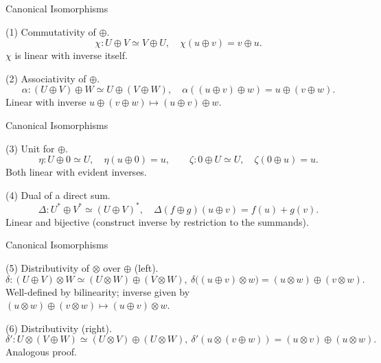 \begin{frame}{Canonical Isomorphisms}
\begin{block}{(1) Commutativity of $\oplus$.}
\[
\chi:U\oplus V\simeq V\oplus U,\quad \chi(u\oplus v)=v\oplus u.
\]
$\chi$ is linear with inverse itself.
\end{block}

\begin{block}{(2) Associativity of $\oplus$.}
\[
\alpha:(U\oplus V)\oplus W \simeq U\oplus (V\oplus W),\quad \alpha((u\oplus v)\oplus w)=u\oplus (v\oplus w).
\]
Linear with inverse $u\oplus (v\oplus w)\mapsto (u\oplus v)\oplus w$.
\end{block}
\end{frame}

\begin{frame}{Canonical Isomorphisms}
\begin{block}{(3) Unit for $\oplus$.}
\[
\eta: U\oplus 0 \simeq U,\quad \eta(u\oplus 0)=u,\qquad
\zeta: 0\oplus U \simeq U,\quad \zeta(0\oplus u)=u.
\]
Both linear with evident inverses.

\end{block}

\begin{block}{(4) Dual of a direct sum.}
\[
\Delta: U^*\oplus V^* \simeq (U\oplus V)^*,\quad
\Delta(f\oplus g)(u\oplus v)= f(u)+g(v).
\]
Linear and bijective (construct inverse by restriction to the summands).

\end{block}
\end{frame}

\begin{frame}{Canonical Isomorphisms}
\begin{block}{(5) Distributivity of $\otimes$ over $\oplus$ (left).}
\[
\delta:(U\oplus V)\otimes W \simeq (U\otimes W)\oplus (V\otimes W),\
\delta\big((u\oplus v)\otimes w\big)=(u\otimes w)\oplus (v\otimes w).
\]
Well-defined by bilinearity; inverse given by $(u\otimes w)\oplus (v\otimes w)\mapsto (u\oplus v)\otimes w$.
\end{block}

\begin{block}{(6) Distributivity (right).}
\[
\delta': U\otimes (V\oplus W) \simeq (U\otimes V)\oplus (U\otimes W),\
\delta'(u\otimes (v\oplus w))=(u\otimes v)\oplus (u\otimes w).
\]
Analogous proof.
\end{block}
\end{frame}






